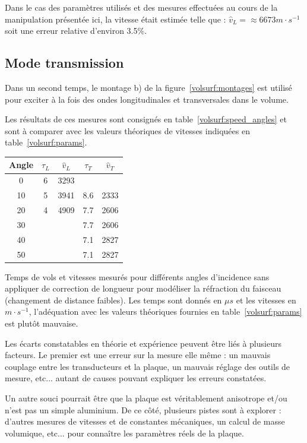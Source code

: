 Dans le cas des paramètres utilisés et des mesures effectuées au cours de la manipulation présentée ici, la vitesse était estimée telle que : $\hat{v}_L = \approx 6673 m\cdot s^{-1}$ soit une erreur relative d'environ 3.5\%.

\subsection{Mode transmission}

Dans un second temps, le montage b) de la figure~\ref{volsurf:montages} est utilisé pour exciter à la fois des ondes longitudinales et transversales dans le volume.

Les résultats de ces mesures sont consignés en table~\ref{volsurf:speed_angles} et sont à comparer avec les valeurs théoriques de vitesses indiquées en table~\ref{volsurf:params}.  

\begin{tablehere}
    \centering
    \begin{tabular}{c|cc|cc}
         Angle & $\tau_L$ & $\hat{v}_L$ & $\tau_T$ & $\hat{v}_T$\\\hline
         0 & 6 & 3293 & & \\
         10 & 5 & 3941 & 8.6 & 2333\\
         20 & 4 & 4909 & 7.7 & 2606\\
         30 & & & 7.7 & 2606\\
         40 & & & 7.1 & 2827\\
         50 & & & 7.1 & 2827\\
    \end{tabular}
    \caption{Temps de vols et vitesses mesurés pour différents angles d'incidence sans appliquer de correction de longueur pour modéliser la réfraction du faisceau (changement de distance faibles). Les temps sont donnés en $\mu s$ et les vitesses en $m\cdot s^{-1}$, l'adéquation avec les valeurs théoriques fournies en table~\ref{volsurf:params} est plutôt mauvaise.}
    \label{volsurf:speed_angles}
\end{tablehere}

Les écarts constatables en théorie et expérience peuvent être liés à plusieurs facteurs.
Le premier est une erreur sur la mesure elle même : un mauvais couplage entre les transducteurs et la plaque, un mauvais réglage des outils de mesure, etc... autant de causes pouvant expliquer les erreurs constatées.

Un autre souci pourrait être que la plaque est véritablement anisotrope et/ou n'est pas un simple aluminium. De ce côté, plusieurs pistes sont à explorer : d'autres mesures de vitesses et de constantes mécaniques, un calcul de masse volumique, etc... pour connaître les paramètres réels de la plaque.

